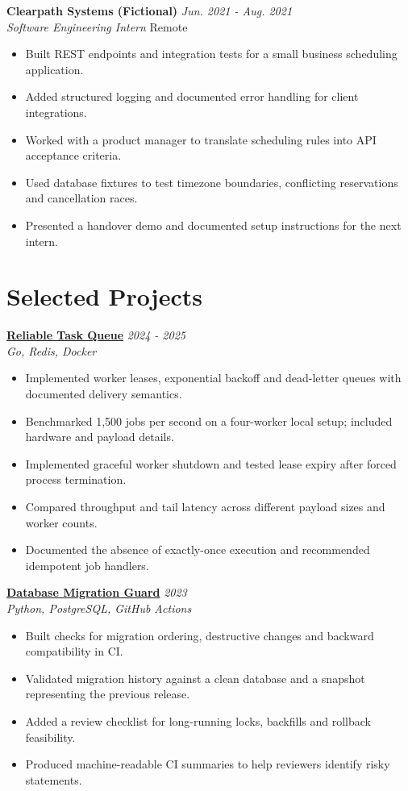 \documentclass[11pt,a4paper]{article}
\begin{document}
\textbf{Clearpath Systems (Fictional)} \hfill \textit{Jun. 2021 - Aug. 2021}\\
\textit{Software Engineering Intern} \hfill Remote
\begin{itemize}[leftmargin=*,noitemsep,topsep=2pt]
\item Built REST endpoints and integration tests for a small business scheduling application.
\item Added structured logging and documented error handling for client integrations.
\item Worked with a product manager to translate scheduling rules into API acceptance criteria.
\item Used database fixtures to test timezone boundaries, conflicting reservations and cancellation races.
\item Presented a handover demo and documented setup instructions for the next intern.
\end{itemize}
\vspace{4pt}

\section{Selected Projects}
\textbf{\href{https://example.com/demos/task-queue}{Reliable Task Queue}} \hfill \textit{2024 - 2025}\\
\textit{Go, Redis, Docker}
\begin{itemize}[leftmargin=*,noitemsep,topsep=2pt]
\item Implemented worker leases, exponential backoff and dead-letter queues with documented delivery semantics.
\item Benchmarked 1,500 jobs per second on a four-worker local setup; included hardware and payload details.
\item Implemented graceful worker shutdown and tested lease expiry after forced process termination.
\item Compared throughput and tail latency across different payload sizes and worker counts.
\item Documented the absence of exactly-once execution and recommended idempotent job handlers.
\end{itemize}

\textbf{\href{https://example.com/demos/migration-guard}{Database Migration Guard}} \hfill \textit{2023}\\
\textit{Python, PostgreSQL, GitHub Actions}
\begin{itemize}[leftmargin=*,noitemsep,topsep=2pt]
\item Built checks for migration ordering, destructive changes and backward compatibility in CI.
\item Validated migration history against a clean database and a snapshot representing the previous release.
\item Added a review checklist for long-running locks, backfills and rollback feasibility.
\item Produced machine-readable CI summaries to help reviewers identify risky statements.
\end{itemize}
\end{document}
